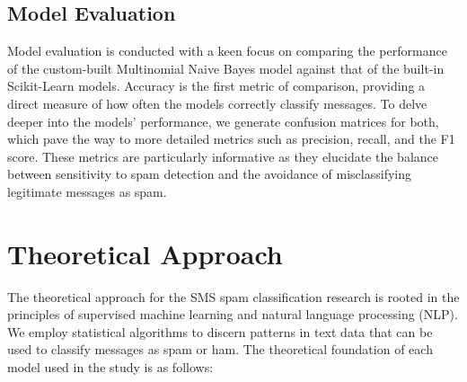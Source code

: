 \documentclass[12pt]{article}
\begin{document}
\subsection{Model Evaluation}
Model evaluation is conducted with a keen focus on comparing the performance of the custom-built Multinomial Naive Bayes model against that of the built-in Scikit-Learn models. Accuracy is the first metric of comparison, providing a direct measure of how often the models correctly classify messages. To delve deeper into the models' performance, we generate confusion matrices for both, which pave the way to more detailed metrics such as precision, recall, and the F1 score. These metrics are particularly informative as they elucidate the balance between sensitivity to spam detection and the avoidance of misclassifying legitimate messages as spam.


\section{Theoretical Approach}

The theoretical approach for the SMS spam classification research is rooted in the principles of supervised machine learning and natural language processing (NLP). We employ statistical algorithms to discern patterns in text data that can be used to classify messages as spam or ham. The theoretical foundation of each model used in the study is as follows:
\end{document}
